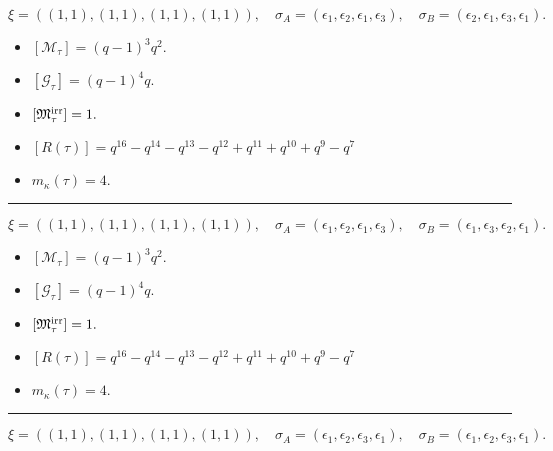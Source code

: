 \documentclass[10pt,a4paper]{amsart}
\begin{document}
$$\xi = ({(1, 1)}, {(1, 1)}, {(1, 1)}, {(1, 1)}),\quad \sigma_A = ({{\epsilon_1}}, {{\epsilon_2}}, {{\epsilon_1}}, {{\epsilon_3}}),\quad \sigma_B = ({{\epsilon_2}}, {{\epsilon_1}}, {{\epsilon_3}}, {{\epsilon_1}}).$$

\begin{itemize}
 \item $[\mathcal{M}_{\tau}] = {\left(q - 1\right)}^{3} q^{2} .$

 \item $[\mathcal{G}_{\tau}] = {\left(q - 1\right)}^{4} q .$

 \item $[{\frak M}_{\tau}^{\textrm{irr}}] = 1 .$

 \item $[R(\tau)] = q^{16} - q^{14} - q^{13} - q^{12} + q^{11} + q^{10} + q^{9} - q^{7} $

 \item $m_{\kappa}(\tau) = 4 .$

 \end{itemize}
\noindent\rule{8cm}{0.4pt}

$$\xi = ({(1, 1)}, {(1, 1)}, {(1, 1)}, {(1, 1)}),\quad \sigma_A = ({{\epsilon_1}}, {{\epsilon_2}}, {{\epsilon_1}}, {{\epsilon_3}}),\quad \sigma_B = ({{\epsilon_1}}, {{\epsilon_3}}, {{\epsilon_2}}, {{\epsilon_1}}).$$

\begin{itemize}
 \item $[\mathcal{M}_{\tau}] = {\left(q - 1\right)}^{3} q^{2} .$

 \item $[\mathcal{G}_{\tau}] = {\left(q - 1\right)}^{4} q .$

 \item $[{\frak M}_{\tau}^{\textrm{irr}}] = 1 .$

 \item $[R(\tau)] = q^{16} - q^{14} - q^{13} - q^{12} + q^{11} + q^{10} + q^{9} - q^{7} $

 \item $m_{\kappa}(\tau) = 4 .$

 \end{itemize}
\noindent\rule{8cm}{0.4pt}

$$\xi = ({(1, 1)}, {(1, 1)}, {(1, 1)}, {(1, 1)}),\quad \sigma_A = ({{\epsilon_1}}, {{\epsilon_2}}, {{\epsilon_3}}, {{\epsilon_1}}),\quad \sigma_B = ({{\epsilon_1}}, {{\epsilon_2}}, {{\epsilon_3}}, {{\epsilon_1}}).$$
\end{document}
